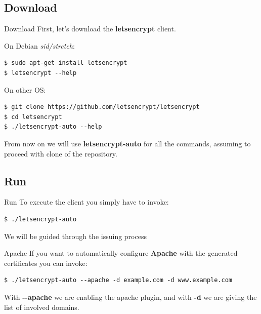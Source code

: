 \documentclass[xcolor=svgnames,11pt]{beamer}
\begin{document}
\subsection{Download}
\begin{frame}[fragile]{Download}
First, let's download the \textbf{letsencrypt} client.

\medskip\pause
On Debian \emph{sid/stretch}:
\begin{block}{}
\begin{scriptsize}
\begin{verbatim}
$ sudo apt-get install letsencrypt
$ letsencrypt --help
\end{verbatim}
\end{scriptsize}
\end{block}

\medskip\pause
On other OS:
\begin{block}{}
\begin{scriptsize}
\begin{verbatim}
$ git clone https://github.com/letsencrypt/letsencrypt
$ cd letsencrypt
$ ./letsencrypt-auto --help
\end{verbatim}
\end{scriptsize}
\end{block}

\medskip\pause

From now on we will use \textbf{letsencrypt-auto} for all the commands, assuming to proceed with clone of the repository.

\end{frame}

\subsection{Run}
\begin{frame}[fragile]{Run}
To execute the client you simply have to invoke:
\begin{block}{}
\begin{scriptsize}
\begin{verbatim}
$ ./letsencrypt-auto
\end{verbatim}
\end{scriptsize}
\end{block}
We will be guided through the issuing process
\end{frame}

\begin{frame}[fragile]{Apache}
If you want to automatically configure \textbf{Apache} with the generated certificates you can invoke:
\begin{block}{}
\begin{scriptsize}
\begin{verbatim}
$ ./letsencrypt-auto --apache -d example.com -d www.example.com
\end{verbatim}
\end{scriptsize}
\end{block}
With \textbf{-{}-apache} we are enabling the apache plugin, and with \textbf{-d} we are giving the list of involved domains.
\end{frame}
\end{document}
